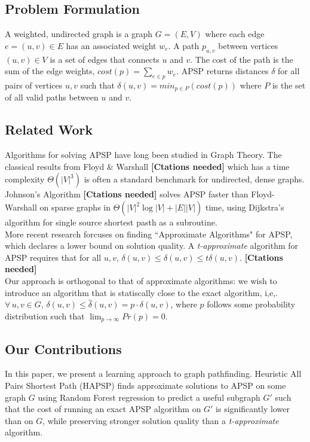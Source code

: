 \documentclass[10.5pt,journal]{IEEEtran}
\begin{document}
\subsection{Problem Formulation}
	A weighted, undirected graph is a graph $G=(E,V)$ where each edge $e=(u,v)\in E$ has an associated weight
	$w_e$. A path $p_{u,v}$ between vertices $(u,v)\in V$ is a set of edges that connects $u$ and $v$. The cost
	of the path is the sum of the edge weights, $cost(p) = \sum_{e\in p}w_e$. APSP returns distances $\delta$
	for all pairs of vertices $u,v$ such that $\delta(u,v) = min_{p\in P} (cost(p))$ where $P$ is the set of
	all valid paths between $u$ and $v$.

\subsection{Related Work}
	Algorithms for solving APSP have long been studied in Graph Theory. The classical results from
	Floyd \& Warshall
	{\bf{[Ctations needed]}}
	which has a time complexity $\Theta(|V|^3)$ is often a standard benchmark for undirected, dense graphs.
	Johnson's Algorithm
	{\bf{[Ctations needed]}}
	solves APSP faster than Floyd-Warshall on sparse graphs in $\Theta(|V|^2 \log|V|+ |E||V|)$ time,
	using Dijkstra's algorithm for single source shortest pasth as a subroutine. \\
	
	More recent research forcuses on finding ``Approximate Algorithms" for APSP, which declares a
	lower bound on solution quality. A {\it{t-approximate}} algorithm for APSP requires that
	for all $u,v$, $\delta(u,v) \le \hat{\delta}(u,v) \le t\delta(u,v)$.
	{\bf{[Ctations needed]}} \\
	
	Our approach is orthogonal to that of approximate algorithms: we wish to introduce an algorithm
	that is statiscally close to the exact algorithm, i,e,. $\forall\,u,v \in G,\, 
	\delta(u,v) \le \hat{\delta}(u,v) = p\cdot\delta(u,v)$, where $p$ follows some probability
	distribution such that $\lim_{p\rightarrow\infty}Pr(p) = 0$.
	
\subsection{Our Contributions}
	In this paper, we present a learning approach to graph pathfinding. Heuristic All Pairs Shortest Path (HAPSP)
	finds approximate solutions to APSP on some graph $G$
	using Random Forest regression to predict a useful subgraph $G'$ such that the cost of running an exact
	APSP algorithm on $G'$ is significantly lower than on $G$, while preserving stronger solution quality
	than a {\it{t-approximate}} algorithm. \\
	
\end{document}
